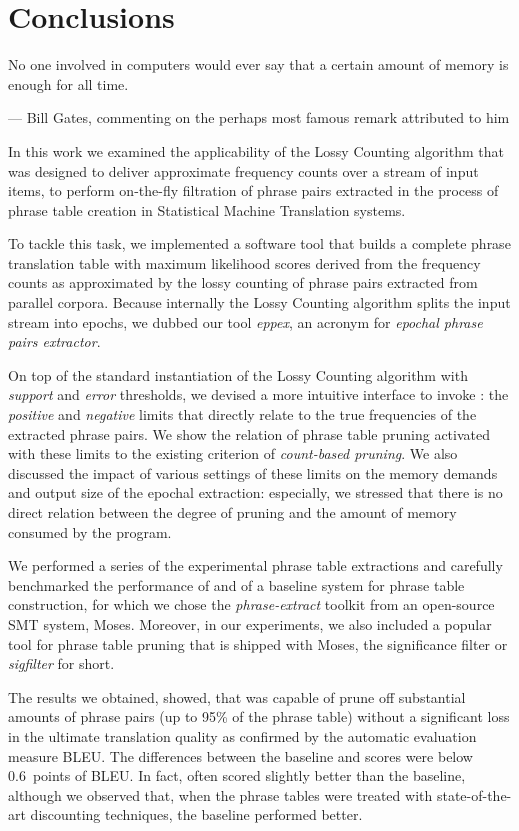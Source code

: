 \chapter{Conclusions}
\label{chap:conclusions}

\setlength{\epigraphwidth}{1.0\textwidth}
\epigraph{No one involved in computers would ever say that a certain amount of memory is enough for all time.}{--- Bill Gates, commenting on the perhaps most famous remark attributed to him}

In this work we examined the applicability of the Lossy Counting algorithm
that was designed to deliver approximate frequency counts over a stream of
input items, to perform on-the-fly filtration of phrase pairs extracted in
the process of phrase table creation in Statistical Machine Translation systems.

To tackle this task, we implemented a software tool that builds a complete phrase
translation table with maximum likelihood scores derived from the frequency
counts as approximated by the lossy counting of phrase pairs extracted from
parallel corpora.
Because internally the Lossy Counting algorithm splits the input stream into
epochs, we dubbed our tool \emph{eppex}, an acronym for \emph{epochal phrase
pairs extractor}.

On top of the standard instantiation of the Lossy Counting algorithm with
\emph{support} and \emph{error} thresholds, we devised a more intuitive interface
to invoke \eppex{}: the \emph{positive} and \emph{negative} limits that
directly relate to the true frequencies of the extracted phrase pairs.
We show the relation of phrase table pruning activated with these limits
to the existing criterion of \emph{count-based pruning}.
We also discussed the impact of various settings of these limits on the memory
demands and output size of the epochal extraction: especially, we stressed
that there is no direct relation between the degree of pruning and the amount
of memory consumed by the program.

We performed a series of the experimental phrase table extractions and carefully
benchmarked the performance of \eppex{} and of a baseline system for phrase
table construction, for which we chose the \emph{phrase-extract} toolkit from
an open-source SMT system, Moses.
Moreover, in our experiments, we also included a popular tool for phrase table
pruning that is shipped with Moses, the significance filter or \emph{sigfilter}
for short.

The results we obtained, showed, that \eppex{} was capable of prune off
substantial amounts of phrase pairs (up to 95\% of the phrase table) without
a significant loss in the ultimate translation quality as confirmed by the
automatic evaluation measure BLEU.
The differences between the baseline and \eppex{} scores were below
0.6~points of BLEU.
In fact, \eppex{} often scored slightly better than the baseline,
although we observed that, when the phrase tables were treated with
state-of-the-art discounting techniques, the baseline performed better.

